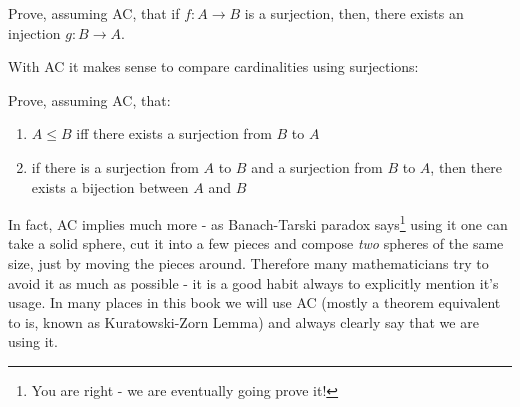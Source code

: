 \begin{exercise}
  Prove, assuming AC, that if $f:A\to B$ is a surjection, then, there exists an injection $g: B\to A$.
\end{exercise}

With AC it makes sense to compare cardinalities using surjections:

\begin{exercise}
  Prove, assuming AC, that:
  \begin{enumerate}
    \item $A\le B$ iff there exists a surjection from $B$ to $A$
    \item if there is a surjection from $A$ to $B$ and a surjection from $B$ to $A$, then there exists a bijection between $A$ and $B$
  \end{enumerate}
\end{exercise}


In fact, AC implies much more - as Banach-Tarski paradox says\footnote{You are right - we are eventually going prove it!} using it one can take a solid sphere, cut it into a few pieces and compose \emph{two}
spheres of the same size, just by moving the pieces around. Therefore many mathematicians try to avoid it as much as possible - it is a good habit always to explicitly mention it's usage. In many places in this book
we will use AC (mostly a theorem equivalent to is, known as Kuratowski-Zorn Lemma) and always clearly say that we are using it.
